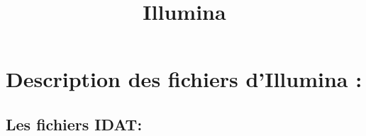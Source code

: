\documentclass[a4paper,10pt]{article}
\title{Illumina}
\author{}
\begin{document}
\maketitle

\begin{abstract}

\end{abstract}

\section{Description des fichiers d'Illumina :}
\subsection{Les fichiers IDAT:}
\end{document}
